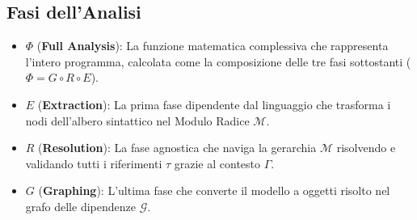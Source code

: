 \subsection{Fasi dell'Analisi}
\begin{itemize}
  \item $\Phi$ (\textbf{Full Analysis}): La funzione matematica
    complessiva che rappresenta l'intero programma, calcolata come la
    composizione delle tre fasi sottostanti ($\Phi = G \circ R \circ E$).
  \item $E$ (\textbf{Extraction}): La prima fase dipendente dal
    linguaggio che trasforma i nodi dell'albero sintattico nel Modulo
    Radice $\mathcal{M}$.
  \item $R$ (\textbf{Resolution}): La fase agnostica che naviga la
    gerarchia $\mathcal{M}$ risolvendo e validando tutti i
    riferimenti $\tau$ grazie al contesto $\Gamma$.
  \item $G$ (\textbf{Graphing}): L'ultima fase che converte il
    modello a oggetti risolto nel grafo delle dipendenze $\mathcal{G}$.
\end{itemize}

